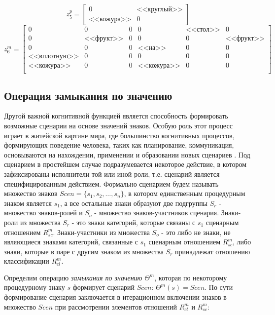 \documentclass[12pt]{scrartcl}
\begin{document}
	\[
	z_5^p = \begin{bmatrix}
	0& \text{<<круглый>>} \\
	\text{<<кожура>>} &0
	\end{bmatrix}
	\]
	\[
	z_6^m= \left[\begin{array}{ccc|cccc}
	0&0&0&0&\text{<<стол>>}&0\\
	0&\text{<<фрукт>>}&0& 0&0&\text{<<фрукт>>}\\
	0& 0& 0 &\text{<<на>>} &0&0\\
	\text{<<вплотную>>}& 0& 0 &0 &0&0\\
	\text{<<кожура>>} &0 &0 &\text{<<кожура>>}  &0&0\\
	\end{array}
	\right]
	\] 
	
	\subsection{Операция замыкания по значению}
	Другой важной когнитивной функцией является способность формировать возможные сценарии на основе значений знаков. Особую роль этот процесс играет в житейской картине мира, где большинство когнитивных процессов, формирующих поведение человека, таких как планирование, коммуникация, основываются на нахождении, применении и образовании новых сценариев \cite{Chudova2012b,Osipov2015d}. Под сценарием в простейшем случае подразумевается некоторое действие, в котором зафиксированы исполнители той или иной роли, т.е. сценарий является специфицированным действием. Формально сценарием будем называть множество знаков $Scen=\{s_1,s_2,\dots, s_n\}$, в котором единственным процедурным знаком является $s_1$, а все остальные знаки образуют две подгруппы $S_r$ - множество знаков-ролей и $S_o$ - множество знаков-участников сценария. Знаки-роли из множества $S_r$ - это знаки категорий, которые связаны с $s_1$ сценарным отношением $R_{sc}^m$. Знаки-участники из множества $S_o$ - это либо не знаки, не являющиеся знаками категорий, связанные с $s_1$ сценарным отношением $R_{sc}^m$, либо знаки, которые в паре с другим знаком из множества $S_r$ принадлежат отношению классификации $R_{cl}^m$.
	
	Определим операцию \textit{замыкания по значению} $\Theta^m$, которая по некоторому процедурному знаку $s$ формирует сценарий $Scen$: $\Theta^m(s)=Scen$. По сути формирование сценария заключается в итерационном включении знаков в множество $Scen$ при рассмотрении элементов отношений $R_{cl}^m$ и $R_{sc}^m$:
	
\end{document}
